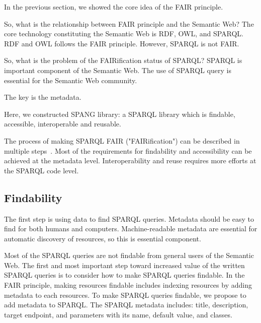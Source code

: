 \documentclass[runningheads]{llncs}
\begin{document}
In the previous section, we showed the core idea of the FAIR principle.

So, what is the relationship between FAIR principle and the Semantic Web?
The core technology constituting the Semantic Web is RDF, OWL, and SPARQL. RDF and OWL follows the FAIR principle. However, SPARQL is not FAIR.

So, what is the problem of the FAIRification status of SPARQL?
SPARQL is important component of the Semantic Web. The use of SPARQL query is essential for the Semantic Web community.

The key is the metadata.

Here, we constructed SPANG library: a SPARQL library which is findable, accessible, interoperable and reusable.

The process of making SPARQL FAIR ("FAIRification") can be described in multiple steps~\cite{fairification}.
Most of the requirements for findability and accessibility can be achieved at the metadata level. Interoperability and reuse requires more efforts at the SPARQL code level.


\subsection{Findability}
The first step is using data to find SPARQL queries. Metadata should be easy to find for both humans and computers. Machine-readable metadata are essential for automatic discovery of resources, so this is essential component.

Most of the SPARQL queries are not findable from general users of the Semantic Web. The first and most important step toward increased value of the written SPARQL queries is to consider how to make SPARQL queries findable.
In the FAIR principle, making resources findable includes indexing resources by adding metadata to each resources. 
To make SPARQL queries findable, we propose to add metadata to SPARQL.
The SPARQL metadata includes: title, description, target endpoint, and parameters with its name, default value, and classes.
\end{document}

